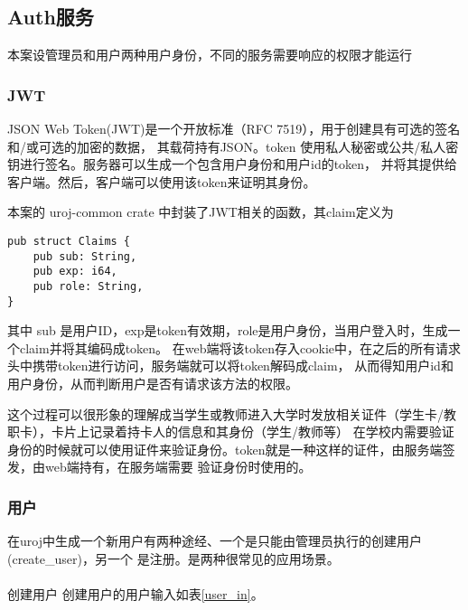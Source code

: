 \subsection{Auth服务}
本案设管理员和用户两种用户身份，不同的服务需要响应的权限才能运行
\subsubsection{JWT}
JSON Web Token(JWT)是一个开放标准（RFC 7519），用于创建具有可选的签名和/或可选的加密的数据，
其载荷持有JSON。token 使用私人秘密或公共/私人密钥进行签名。服务器可以生成一个包含用户身份和用户id的token，
并将其提供给客户端。然后，客户端可以使用该token来证明其身份。

本案的 uroj-common crate 中封装了JWT相关的函数，其claim定义为
\begin{lstlisting}
pub struct Claims {
    pub sub: String,
    pub exp: i64,
    pub role: String,
}
\end{lstlisting}

其中 sub 是用户ID，exp是token有效期，role是用户身份，当用户登入时，生成一个claim并将其编码成token。
在web端将该token存入cookie中，在之后的所有请求头中携带token进行访问，服务端就可以将token解码成claim，
从而得知用户id和用户身份，从而判断用户是否有请求该方法的权限。

这个过程可以很形象的理解成当学生或教师进入大学时发放相关证件（学生卡/教职卡），卡片上记录着持卡人的信息和其身份（学生/教师等）
在学校内需要验证身份的时候就可以使用证件来验证身份。token就是一种这样的证件，由服务端签发，由web端持有，在服务端需要
验证身份时使用的。

\subsubsection{用户}
在uroj中生成一个新用户有两种途经、一个是只能由管理员执行的创建用户(create\_user)，另一个
是注册。是两种很常见的应用场景。

\paragraph{}创建用户
创建用户的用户输入如表\ref{user_in}。

